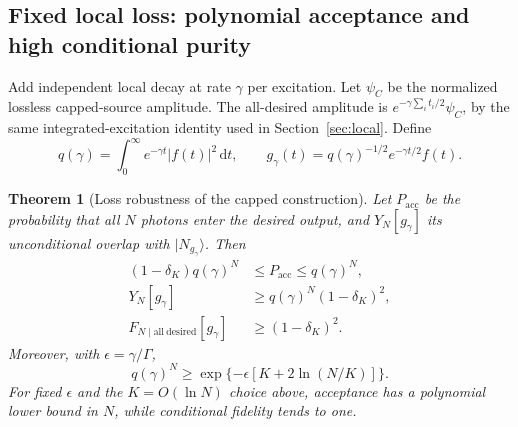 \documentclass[11pt,a4paper]{article}
\newtheorem{theorem}{Theorem}
\newcommand{\Fock}[2]{\lvert #1_{#2}\rangle}
\newcommand{\dd}{\,\mathrm d}
\begin{document}
\subsection{Fixed local loss: polynomial acceptance and high conditional purity}

Add independent local decay at rate \(\gamma\) per excitation.
Let \(\psi_C\) be the normalized lossless capped-source amplitude.
The all-desired amplitude is
\(e^{-\gamma\sum_i t_i/2}\psi_C\), by the same integrated-excitation
identity used in Section~\ref{sec:local}. Define
\begin{equation}
 q(\gamma)=\int_0^\infty e^{-\gamma t}|f(t)|^2\dd t,\qquad
 g_\gamma(t)=q(\gamma)^{-1/2}e^{-\gamma t/2}f(t).
 \label{eq:tiltedmode}
\end{equation}

\begin{theorem}[Loss robustness of the capped construction]
Let \(P_{\mathrm{acc}}\) be the probability that all \(N\) photons
enter the desired output, and \(Y_N[g_\gamma]\) its unconditional
overlap with \(\Fock{N}{g_\gamma}\). Then
\begin{align}
 (1-\delta_K)q(\gamma)^N
 &\le P_{\mathrm{acc}}\le q(\gamma)^N, \label{eq:accbounds}\\
 Y_N[g_\gamma]&\ge q(\gamma)^N(1-\delta_K)^2,\\
 F_{N\mid\mathrm{all\ desired}}[g_\gamma]
 &\ge(1-\delta_K)^2. \label{eq:lossF}
\end{align}
Moreover, with \(\epsilon=\gamma/\Gamma\),
\begin{equation}
 q(\gamma)^N
 \ge\exp\{-\epsilon[K+2\ln(N/K)]\}.
 \label{eq:polysuccess}
\end{equation}
For fixed \(\epsilon\) and the \(K=O(\ln N)\) choice above,
acceptance has a polynomial lower bound in \(N\), while conditional
fidelity tends to one.
\end{theorem}
\end{document}
